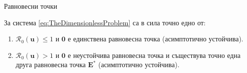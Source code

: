 \begin{frame}[t]{Равновесни точки}
  \begin{proposition}
    За система \eqref{eq:TheDimensionlessProblem} са в сила точно едно от:
    \begin{enumerate}
      \item $\mathscr{R}_0(\boldsymbol{u}) \leq 1$ и $\boldsymbol{0}$ е единствена равновесна точка (асимптотично устойчива).
      \item  $\mathscr{R}_0(\boldsymbol{u}) > 1$ и $\boldsymbol{0}$ е неустойчива равновесна точка и съществува точно една друга равновесна точка $\boldsymbol{E}^*$ (асимптотично устойчива).
    \end{enumerate}
  \end{proposition}
\end{frame}
